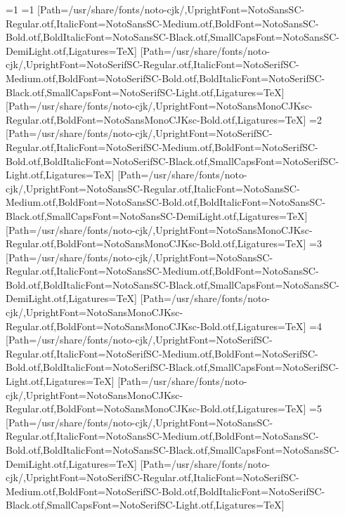 \fi\fi\fi\fi\fi\fi\fi\fi\else
\ifnum\value{CJKLanguage}=1
\ifnum\value{CJKFonts}=1
[Path=/usr/share/fonts/noto-cjk/,UprightFont=NotoSansSC-Regular.otf,ItalicFont=NotoSansSC-Medium.otf,BoldFont=NotoSansSC-Bold.otf,BoldItalicFont=NotoSansSC-Black.otf,SmallCapsFont=NotoSansSC-DemiLight.otf,Ligatures=TeX]
[Path=/usr/share/fonts/noto-cjk/,UprightFont=NotoSerifSC-Regular.otf,ItalicFont=NotoSerifSC-Medium.otf,BoldFont=NotoSerifSC-Bold.otf,BoldItalicFont=NotoSerifSC-Black.otf,SmallCapsFont=NotoSerifSC-Light.otf,Ligatures=TeX]
[Path=/usr/share/fonts/noto-cjk/,UprightFont=NotoSansMonoCJKsc-Regular.otf,BoldFont=NotoSansMonoCJKsc-Bold.otf,Ligatures=TeX]
\else\ifnum\value{CJKFonts}=2
[Path=/usr/share/fonts/noto-cjk/,UprightFont=NotoSerifSC-Regular.otf,ItalicFont=NotoSerifSC-Medium.otf,BoldFont=NotoSerifSC-Bold.otf,BoldItalicFont=NotoSerifSC-Black.otf,SmallCapsFont=NotoSerifSC-Light.otf,Ligatures=TeX]
[Path=/usr/share/fonts/noto-cjk/,UprightFont=NotoSansSC-Regular.otf,ItalicFont=NotoSansSC-Medium.otf,BoldFont=NotoSansSC-Bold.otf,BoldItalicFont=NotoSansSC-Black.otf,SmallCapsFont=NotoSansSC-DemiLight.otf,Ligatures=TeX]
[Path=/usr/share/fonts/noto-cjk/,UprightFont=NotoSansMonoCJKsc-Regular.otf,BoldFont=NotoSansMonoCJKsc-Bold.otf,Ligatures=TeX]
\else\ifnum\value{CJKFonts}=3
[Path=/usr/share/fonts/noto-cjk/,UprightFont=NotoSansSC-Regular.otf,ItalicFont=NotoSansSC-Medium.otf,BoldFont=NotoSansSC-Bold.otf,BoldItalicFont=NotoSansSC-Black.otf,SmallCapsFont=NotoSansSC-DemiLight.otf,Ligatures=TeX]
[Path=/usr/share/fonts/noto-cjk/,UprightFont=NotoSansMonoCJKsc-Regular.otf,BoldFont=NotoSansMonoCJKsc-Bold.otf,Ligatures=TeX]
\else\ifnum\value{CJKFonts}=4
[Path=/usr/share/fonts/noto-cjk/,UprightFont=NotoSerifSC-Regular.otf,ItalicFont=NotoSerifSC-Medium.otf,BoldFont=NotoSerifSC-Bold.otf,BoldItalicFont=NotoSerifSC-Black.otf,SmallCapsFont=NotoSerifSC-Light.otf,Ligatures=TeX]
[Path=/usr/share/fonts/noto-cjk/,UprightFont=NotoSansMonoCJKsc-Regular.otf,BoldFont=NotoSansMonoCJKsc-Bold.otf,Ligatures=TeX]
\else\ifnum\value{CJKFonts}=5
[Path=/usr/share/fonts/noto-cjk/,UprightFont=NotoSansSC-Regular.otf,ItalicFont=NotoSansSC-Medium.otf,BoldFont=NotoSansSC-Bold.otf,BoldItalicFont=NotoSansSC-Black.otf,SmallCapsFont=NotoSansSC-DemiLight.otf,Ligatures=TeX]
[Path=/usr/share/fonts/noto-cjk/,UprightFont=NotoSerifSC-Regular.otf,ItalicFont=NotoSerifSC-Medium.otf,BoldFont=NotoSerifSC-Bold.otf,BoldItalicFont=NotoSerifSC-Black.otf,SmallCapsFont=NotoSerifSC-Light.otf,Ligatures=TeX]
